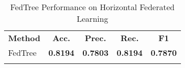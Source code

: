 \begin{table}[ht]\n  \centering\n  \caption{FedTree Performance on Horizontal Federated Learning}\n  \label{tab:fedtree_horizontal_fl}\n  \begin{tabular}{lcccc}\n  \toprule\n  \textbf{Method} & \textbf{Acc.} & \textbf{Prec.} & \textbf{Rec.} & \textbf{F1} \\\n  \midrule\n  FedTree & \textbf{0.8194} & \textbf{0.7803} & \textbf{0.8194} & \textbf{0.7870} \\\n  \bottomrule\n  \end{tabular}\n\end{table}
